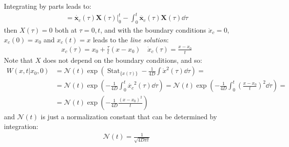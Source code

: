 \documentclass[../template.tex]{subfiles}
\begin{document}
Integrating by parts leads to:
\begin{align*}
    = \dot{\bm{x}_c}(\tau) \bm{X}(\tau) \Big|_0^t - \int_0^t \ddot{\bm{x}_c}(\tau) \bm{X}(\tau) \dd{\tau}
\end{align*}
then $X(\tau) = 0$ both at $\tau = 0,t$, and with the boundary conditions $\ddot{x}_c = 0$, $x_c(0) = x_0$ and $x_c(t) = x$ leads to the \textit{line solution}:
\begin{align*}
    x_c(\tau) = x_0 + \frac{\tau}{t}(x- x_0)   \quad \dot{x}_c(\tau) = \frac{x-x_0}{t} 
\end{align*}     
Note that $X$ does not depend on the boundary conditions, and so:
\begin{align*}
    W(x,t|x_0,0) &= \mathcal{N}(t) \exp\left(\operatorname{Stat}_{\{x(\tau)\}}  -\frac{1}{4D}\int \dot{x}^2 (\tau) \dd{\tau} \right) = \\
    &= \mathcal{N}(t) \exp\left(-\frac{1}{4D} \int_0^t \dot{x_c}^2 (\tau) \dd{\tau} \right) = \mathcal{N}(t) \exp\left(-\frac{1}{4D} \int_0^t \left(\frac{x-x_0 }{t} \right)^2 \dd{\tau}\right) = 
    \\
    &= \mathcal{N}(t) \exp\left(-\frac{1}{4D} \frac{(x-x_0)^2}{t}  \right)
\end{align*} 
and $\mathcal{N}(t)$ is just a normalization constant that can be determined by integration:
\begin{align*}
    \mathcal{N}(t) = \frac{1}{\sqrt{4 D \pi t}} 
\end{align*} 
 
\end{document}
